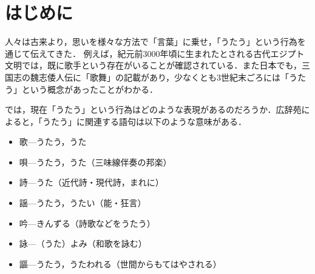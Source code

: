 
\section{はじめに}
人々は古来より，思いを様々な方法で「言葉」に乗せ，「うたう」という行為を通じて伝えてきた．
%
例えば，紀元前3000年頃に生まれたとされる古代エジプト文明では，既に歌手という存在がいることが確認されている\cite{eziputo}．また日本でも，三国志の魏志倭人伝に「歌舞」の記載があり，少なくとも3世紀末ごろには「うたう」という概念があったことがわかる\cite{gisiwazinden}．\par
では，現在「うたう」という行為はどのような表現があるのだろうか．広辞苑\cite{kozien}によると，「うたう」に関連する語句は以下のような意味がある．
\begin{itemize}
  \item 歌---うたう，うた
  \item 唄---うたう，うた（三味線伴奏の邦楽）
  \item 詩---うた（近代詩・現代詩，まれに）
  \item 謡---うたう，うたい（能・狂言）
  \item 吟---きんずる（詩歌などをうたう）
  \item 詠---（うた）よみ（和歌を詠む）
  \item 謳---うたう，うたわれる（世間からもてはやされる）
\end{itemize}
